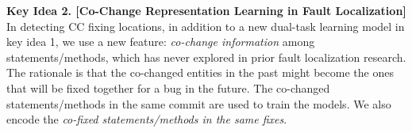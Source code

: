 





{\bf Key Idea 2. [Co-Change Representation Learning in Fault
    Localization]} In detecting CC fixing locations, in addition to a
new dual-task learning model in key idea 1, we use a new feature:
{\em co-change information} among statements/methods, which has never
explored in prior fault localization research. The rationale
is that the co-changed entities in the past might become the ones that
will be fixed together for a bug in the future.
%
The co-changed statements/methods in the same commit are used to train
the models. We also encode the {\em co-fixed statements/methods in
the same fixes}.



